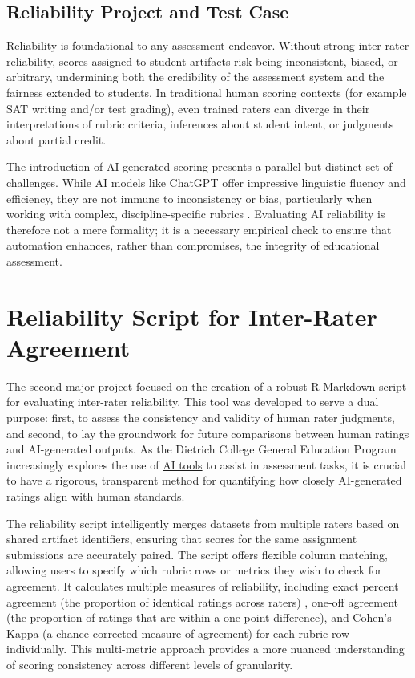 \documentclass[12pt]{article}%
\begin{document}
\subsection*{Reliability Project and Test Case}

Reliability is foundational to any assessment endeavor. Without strong inter-rater reliability, scores assigned to student artifacts risk being inconsistent, biased, or arbitrary, undermining both the credibility of the assessment system and the fairness extended to students. In traditional human scoring contexts (for example SAT writing and/or test grading), even trained raters can diverge in their interpretations of rubric criteria, inferences about student intent, or judgments about partial credit. 

The introduction of AI-generated scoring presents a parallel but distinct set of challenges. While AI models like ChatGPT offer impressive linguistic fluency and efficiency, they are not immune to inconsistency or bias, particularly when working with complex, discipline-specific rubrics \citep{atasoy2025}. Evaluating AI reliability is therefore not a mere formality; it is a necessary empirical check to ensure that automation enhances, rather than compromises, the integrity of educational assessment.

\section{Reliability Script for Inter-Rater Agreement}

The second major project focused on the creation of a robust R Markdown script for evaluating inter-rater reliability. This tool was developed to serve a dual purpose: first, to assess the consistency and validity of human rater judgments, and second, to lay the groundwork for future comparisons between human ratings and AI-generated outputs. As the Dietrich College General Education Program increasingly explores the use of \href{https://studentprivacy.ed.gov/ferpa}{AI tools} to assist in assessment tasks, it is crucial to have a rigorous, transparent method for quantifying how closely AI-generated ratings align with human standards.

The reliability script intelligently merges datasets from multiple raters based on shared artifact identifiers, ensuring that scores for the same assignment submissions are accurately paired. The script offers flexible column matching, allowing users to specify which rubric rows or metrics they wish to check for agreement. It calculates multiple measures of reliability, including exact percent agreement (the proportion of identical ratings across raters) \cite{gwet2014}, one-off agreement (the proportion of ratings that are within a one-point difference), and Cohen's Kappa (a chance-corrected measure of agreement) \cite{cohen1960, mchugh2012} for each rubric row individually. This multi-metric approach provides a more nuanced understanding of scoring consistency across different levels of granularity.
\end{document}
